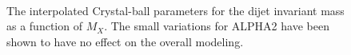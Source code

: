\begin{figure}[htpb]
\\
\caption{The interpolated Crystal-ball parameters for the dijet invariant mass as a function of $M_X$. The small variations for ALPHA2 have been shown to have no effect on the overall modeling.}
\label{fig:MVVShapeParam}
\end{figure}



